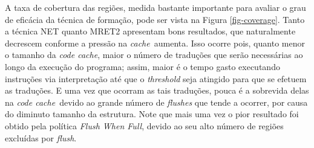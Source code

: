 \documentclass[12pt,twoside]{article}
\newcommand{\ccache}{\emph{code cache}}
\newcommand{\cache}{\emph{cache}}
\newcommand{\flush}{\emph{Flush When Full}}
\begin{document}
A taxa de cobertura das regiões, medida bastante importante para avaliar o grau de eficácia da técnica de formação, pode ser vista na Figura \ref{fig-coverage}. Tanto a técnica NET quanto MRET2 apresentam bons resultados, que naturalmente decrescem conforme a pressão na \cache~aumenta. Isso ocorre pois, quanto menor o tamanho da \ccache, maior o número de traduções que serão necessárias ao longo da execução do programa; assim, maior é o tempo gasto executando instruções via interpretação até que o \emph{threshold} seja atingido para que se efetuem as traduções. E uma vez que ocorram as tais traduções, pouca é a sobrevida delas na \ccache~devido ao grande número de \emph{flushes} que tende a ocorrer, por causa do diminuto tamanho da estrutura. Note que mais uma vez o pior resultado foi obtido pela política \flush, devido ao seu alto número de regiões excluídas por \emph{flush}.
\end{document}

